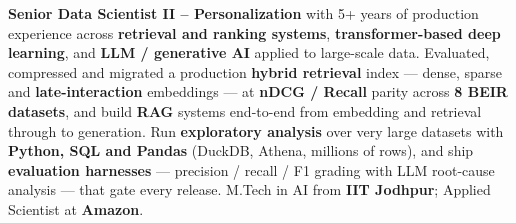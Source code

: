 \documentclass[letter,10pt]{article}
\begin{document}

\textbf{Senior Data Scientist II -- Personalization} with 5+ years of production experience across \textbf{retrieval and ranking systems}, \textbf{transformer-based deep learning}, and \textbf{LLM / generative AI} applied to large-scale data.
Evaluated, compressed and migrated a production \textbf{hybrid retrieval} index --- dense, sparse and \textbf{late-interaction} embeddings --- at \textbf{nDCG / Recall} parity across \textbf{8 BEIR datasets}, and build \textbf{RAG} systems end-to-end from embedding and retrieval through to generation.
Run \textbf{exploratory analysis} over very large datasets with \textbf{Python, SQL and Pandas} (DuckDB, Athena, millions of rows), and ship \textbf{evaluation harnesses} --- precision / recall / F1 grading with LLM root-cause analysis --- that gate every release.
M.Tech in AI from \textbf{IIT Jodhpur}; Applied Scientist at \textbf{Amazon}.
\end{document}
